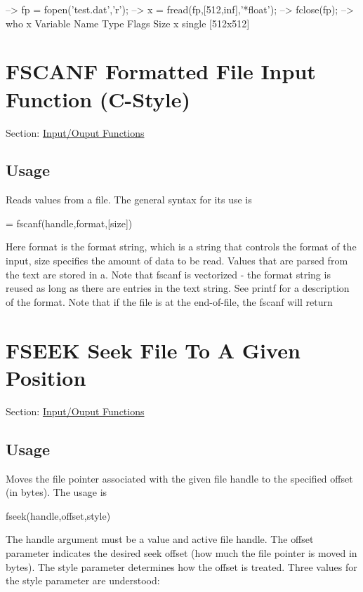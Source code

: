 \begin{DoxyVerbInclude}
--> fp = fopen('test.dat','r');
--> x = fread(fp,[512,inf],'*float');
--> fclose(fp);
--> who x
  Variable Name       Type   Flags             Size
              x    single                    [512x512]
\end{DoxyVerbInclude}
 \hypertarget{io_fscanf}{}\section{F\-S\-C\-A\-N\-F Formatted File Input Function (C-\/\-Style)}\label{io_fscanf}
Section\-: \hyperlink{sec_io}{Input/\-Ouput Functions} \hypertarget{vtkwidgets_vtkxyplotwidget_Usage}{}\subsection{Usage}\label{vtkwidgets_vtkxyplotwidget_Usage}
Reads values from a file. The general syntax for its use is \begin{DoxyVerb}  [a,count] = fscanf(handle,format,[size])
\end{DoxyVerb}
 Here {\ttfamily format} is the format string, which is a string that controls the format of the input, {\ttfamily size} specifies the amount of data to be read. Values that are parsed from the {\ttfamily text} are stored in a. Note that fscanf is vectorized -\/ the format string is reused as long as there are entries in the {\ttfamily text} string. See {\ttfamily printf} for a description of the format. Note that if the file is at the end-\/of-\/file, the fscanf will return \hypertarget{io_fseek}{}\section{F\-S\-E\-E\-K Seek File To A Given Position}\label{io_fseek}
Section\-: \hyperlink{sec_io}{Input/\-Ouput Functions} \hypertarget{vtkwidgets_vtkxyplotwidget_Usage}{}\subsection{Usage}\label{vtkwidgets_vtkxyplotwidget_Usage}
Moves the file pointer associated with the given file handle to the specified offset (in bytes). The usage is \begin{DoxyVerb}  fseek(handle,offset,style)
\end{DoxyVerb}
 The {\ttfamily handle} argument must be a value and active file handle. The {\ttfamily offset} parameter indicates the desired seek offset (how much the file pointer is moved in bytes). The {\ttfamily style} parameter determines how the offset is treated. Three values for the {\ttfamily style} parameter are understood\-: 
